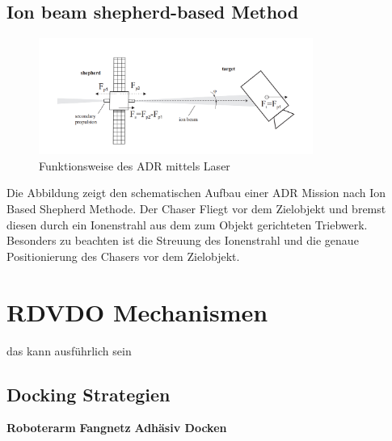 \subsection{Ion beam shepherd-based Method}

	\begin{figure}[h]
			\centering
					\includegraphics[width=0.80\textwidth]{./graphics/ADR/Shepherd.PNG}
				\caption{Funktionsweise des ADR mittels Laser}
				\label{fig:Laser}
			\end{figure}

Die Abbildung  zeigt den schematischen Aufbau einer ADR Mission nach Ion Based Shepherd Methode. Der Chaser Fliegt vor dem Zielobjekt und bremst diesen durch ein Ionenstrahl aus dem zum Objekt gerichteten Triebwerk. Besonders zu beachten ist die Streuung des Ionenstrahl und die genaue Positionierung des Chasers vor dem Zielobjekt.

	\section{RDVDO Mechanismen} das kann ausführlich sein
		\subsection{Docking Strategien}
						\textbf{Roboterarm}
						\textbf{Fangnetz}
						\textbf{Adhäsiv Docken}
		\newpage
		
